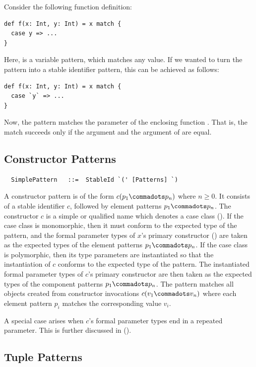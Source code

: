 \example Consider the following function definition:
\begin{lstlisting}
def f(x: Int, y: Int) = x match {
  case y => ...
}
\end{lstlisting}
Here, \lstinline@y@ is a variable pattern, which matches any value.
If we wanted to turn the pattern into a stable identifier pattern, this
can be achieved as follows:
\begin{lstlisting}
def f(x: Int, y: Int) = x match {
  case `y` => ...
}
\end{lstlisting}
Now, the pattern matches the  parameter of the enclosing function .
That is, the match succeeds only if the  argument and the 
argument of  are equal.

\subsection{Constructor Patterns}

\syntax\begin{lstlisting}
  SimplePattern   ::=  StableId `(' [Patterns] `)
\end{lstlisting}

A constructor pattern is of the form $c(p_1 \commadots p_n)$ where $n
\geq 0$. It consists of a stable identifier $c$, followed by element
patterns $p_1 \commadots p_n$. The constructor $c$ is a simple or
qualified name which denotes a case class
(). If the case class is monomorphic, then it
must conform to the expected type of the pattern, and the formal
parameter types of $x$'s primary constructor ()
are taken as the expected types of the element patterns $p_1\commadots
p_n$.  If the case class is polymorphic, then its type parameters are
instantiated so that the instantiation of $c$ conforms to the expected
type of the pattern. The instantiated formal parameter types of $c$'s
primary constructor are then taken as the expected types of the
component patterns $p_1\commadots p_n$.  The pattern matches all
objects created from constructor invocations $c(v_1 \commadots v_n)$
where each element pattern $p_i$ matches the corresponding value
$v_i$.

A special case arises when $c$'s formal parameter types end in a
repeated parameter. This is further discussed in
().

\subsection{Tuple Patterns}

